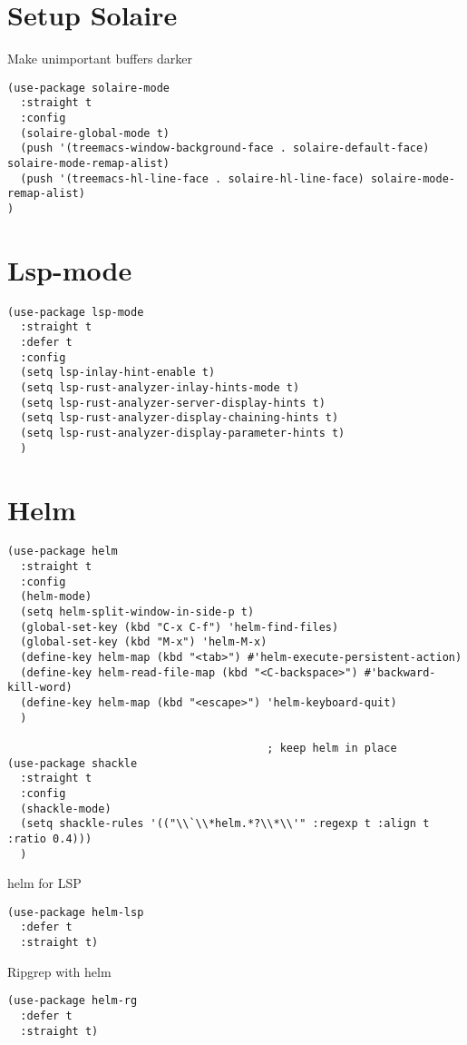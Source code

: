 \documentclass[11pt]{article}
\begin{document}
\section{Setup Solaire}
\label{sec:org023e576}
Make unimportant buffers darker
\begin{verbatim}
(use-package solaire-mode
  :straight t
  :config
  (solaire-global-mode t)
  (push '(treemacs-window-background-face . solaire-default-face) solaire-mode-remap-alist)
  (push '(treemacs-hl-line-face . solaire-hl-line-face) solaire-mode-remap-alist)
)
\end{verbatim}
\section{Lsp-mode}
\label{sec:orgd0e4b65}
\begin{verbatim}
(use-package lsp-mode
  :straight t
  :defer t
  :config
  (setq lsp-inlay-hint-enable t)
  (setq lsp-rust-analyzer-inlay-hints-mode t)
  (setq lsp-rust-analyzer-server-display-hints t)
  (setq lsp-rust-analyzer-display-chaining-hints t)
  (setq lsp-rust-analyzer-display-parameter-hints t)
  )
\end{verbatim}
\section{Helm}
\label{sec:orgf91395c}
\begin{verbatim}
(use-package helm
  :straight t
  :config
  (helm-mode)
  (setq helm-split-window-in-side-p t)
  (global-set-key (kbd "C-x C-f") 'helm-find-files)
  (global-set-key (kbd "M-x") 'helm-M-x)
  (define-key helm-map (kbd "<tab>") #'helm-execute-persistent-action)
  (define-key helm-read-file-map (kbd "<C-backspace>") #'backward-kill-word)
  (define-key helm-map (kbd "<escape>") 'helm-keyboard-quit)
  )

                                        ; keep helm in place
(use-package shackle
  :straight t
  :config
  (shackle-mode)
  (setq shackle-rules '(("\\`\\*helm.*?\\*\\'" :regexp t :align t :ratio 0.4)))
  )
\end{verbatim}

helm for LSP
\begin{verbatim}
(use-package helm-lsp
  :defer t
  :straight t)
\end{verbatim}

Ripgrep with helm
\begin{verbatim}
(use-package helm-rg
  :defer t
  :straight t)
\end{verbatim}
\end{document}
